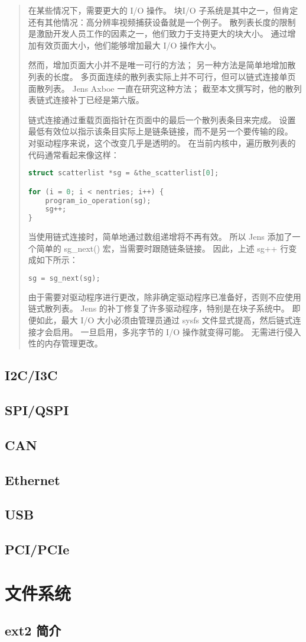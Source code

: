 \begin{quote}
在某些情况下，需要更大的 I/O 操作。
块I/O 子系统是其中之一，但肯定还有其他情况：高分辨率视频捕获设备就是一个例子。
散列表长度的限制是激励开发人员工作的因素之一，他们致力于支持更大的块大小。
通过增加有效页面大小，他们能够增加最大 I/O 操作大小。

然而，增加页面大小并不是唯一可行的方法；
另一种方法是简单地增加散列表的长度。
多页面连续的散列表实际上并不可行，但可以链式连接单页面散列表。
Jens Axboe 一直在研究这种方法；
截至本文撰写时，他的散列表链式连接补丁已经是第六版。

链式连接通过重载页面指针在页面中的最后一个散列表条目来完成。
设置最低有效位以指示该条目实际上是链条链接，而不是另一个要传输的段。
对驱动程序来说，这个改变几乎是透明的。
在当前内核中，遍历散列表的代码通常看起来像这样：

\begin{lstlisting}[language=C]
struct scatterlist *sg = &the_scatterlist[0];

for (i = 0; i < nentries; i++) {
    program_io_operation(sg);
    sg++;
}
\end{lstlisting}

当使用链式连接时，简单地通过数组递增将不再有效。
所以 Jens 添加了一个简单的 sg\_next() 宏，当需要时跟随链条链接。
因此，上述 sg++ 行变成如下所示：

\begin{lstlisting}[language=C]
sg = sg_next(sg);
\end{lstlisting}

由于需要对驱动程序进行更改，除非确定驱动程序已准备好，否则不应使用链式散列表。
Jens 的补丁修复了许多驱动程序，特别是在块子系统中。
即便如此，最大 I/O 大小必须由管理员通过 sysfs 文件显式提高，然后链式连接才会启用。
一旦启用，多兆字节的 I/O 操作就变得可能。
无需进行侵入性的内存管理更改。
\end{quote}

\subsection{I2C/I3C}

\subsection{SPI/QSPI}

\subsection{CAN}

\subsection{Ethernet}

\subsection{USB}

\subsection{PCI/PCIe}

\section{文件系统}

\subsection{ext2 简介}
